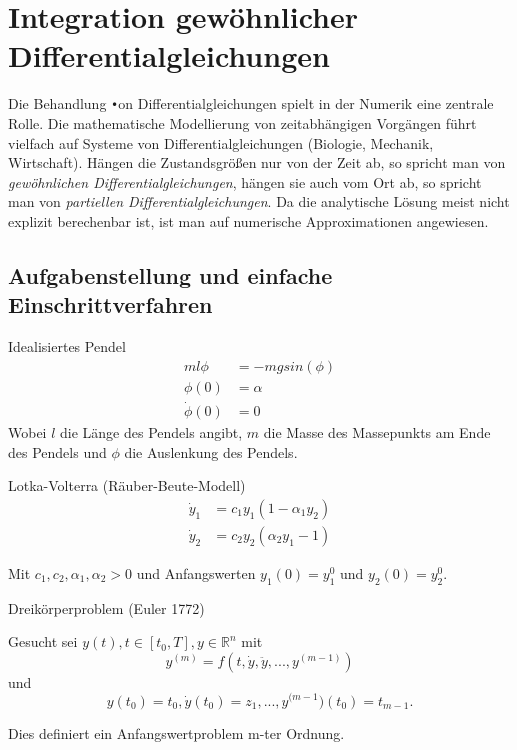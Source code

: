 \section{Integration gewöhnlicher Differentialgleichungen}

Die Behandlung \verb|•|on Differentialgleichungen spielt in der Numerik eine zentrale Rolle. Die mathematische Modellierung von zeitabhängigen Vorgängen führt vielfach auf Systeme von Differentialgleichungen (Biologie, Mechanik, Wirtschaft). Hängen die Zustandsgrößen nur von der Zeit ab, so spricht man von \emph{gewöhnlichen Differentialgleichungen}, hängen sie auch vom Ort ab, so spricht man von \emph{partiellen Differentialgleichungen}. Da die analytische Lösung meist nicht explizit berechenbar ist, ist man auf numerische Approximationen angewiesen.

\subsection{Aufgabenstellung und einfache Einschrittverfahren}

\begin{example} 
	Idealisiertes Pendel
	\begin{align}
		\nonumber m l \phi &= -m g sin(\phi)\\
		\nonumber \phi(0) &= \alpha\\
		\nonumber \dot{\phi}(0) &= 0
	\end{align}
	Wobei $l$ die Länge des Pendels angibt, $m$ die Masse des Massepunkts am Ende des Pendels und $\phi$ die Auslenkung des Pendels.
\end{example}

\begin{example} 
	Lotka-Volterra (Räuber-Beute-Modell)
	\begin{align}
		\nonumber\dot{y}_1 &= c_1y_1(1-\alpha_1y_2)\\
		\nonumber\dot{y}_2 &= c_2y_2(\alpha_2y_1-1)
	\end{align}
		
	Mit $c_1, c_2, \alpha_1, \alpha_2 > 0$ und Anfangswerten $y_1(0) = y^0_1$ und $y_2(0) = y^0_2$.
\end{example}

\begin{example} 
	Dreikörperproblem (Euler 1772)
\end{example}

\begin{definition}[Definition IV.1]
	Gesucht sei 
	$y(t), t \in [t_0, T], y \in \mathbb{R}^n$ mit 
	$$y^{(m)} = f(t, \dot{y}, \ddot{y}, ..., y^{(m-1)})$$
	und
	$$y(t_0) = t_0, \dot{y}(t_0) = z_1, ..., y^{(m-1})(t_0) = t_{m-1}.$$
	
	Dies definiert ein Anfangswertproblem m-ter Ordnung.
\end{definition}

